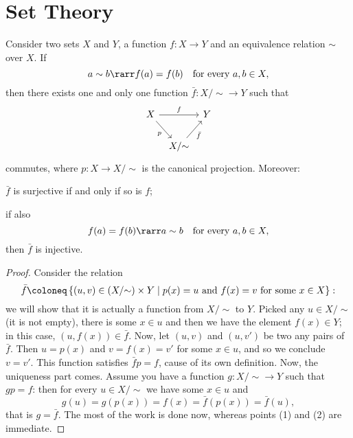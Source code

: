 
\section{Set Theory}


\begin{proposition}\label{prop:SetIso1}
Consider two sets \(X\) and \(Y\), a function \(f : X \to Y\) and an equivalence relation \(\sim\) over \(X\). If
\[a \sim b \rarr f(a) = f(b) \quad\text{for every } a, b \in X ,\]
then there exists one and only one function \(\bar f : X{/}{\sim} \to Y\) such that
\[\begin{tikzcd}[column sep=tiny]
X \ar["f", rr] \ar["p", swap, dr] & & Y \\
& X{/}{\sim} \ar["{\bar f}", swap, ur]
\end{tikzcd}\]
commutes, where \(p : X \to X{/}{\sim}\) is the canonical projection. Moreover: 
\begin{tcbenum}
\item \(\bar f\) is surjective if and only if so is \(f\);
\item if also
\[f(a) = f(b) \rarr a \sim b \quad\text{for every } a, b \in X ,\]
then \(\bar f\) is injective.
\end{tcbenum}
\end{proposition}

\begin{proof}
Consider the relation
\[\bar f \coloneq \set{(u, v) \in \mathcal (X{/}{\sim}) \times Y \mid p(x) = u \text{ and } f(x) = v \text{ for some } x \in X} :\]
we will show that it is actually a function from \(X{/}{\sim}\) to \(Y\). Picked any \(u \in X{/}{\sim}\) (it is not empty), there is some \(x \in u\) and then we have the element \(f(x) \in Y\); in this case, \((u, f(x)) \in \bar f\). Now, let \((u, v)\) and \((u, v')\) be two any pairs of \(\bar f\). Then \(u = p(x)\) and \(v = f(x) = v'\) for some \(x \in u\), and so we conclude \(v = v'\). This function satisfies \(\bar f p = f\), cause of its own definition.\newline
Now, the uniqueness part comes. Assume you have a function \(g : X{/}{\sim} \to Y\) such that \(gp = f\): then for every \(u \in X{/}{\sim}\) we have some \(x \in u\) and
\[g(u) = g(p(x)) = f(x) = \bar f (p(x)) = \bar f(u) ,\]
that is \(g = \bar f\).\newline
The most of the work is done now, whereas points (1) and (2) are immediate.
\end{proof}

